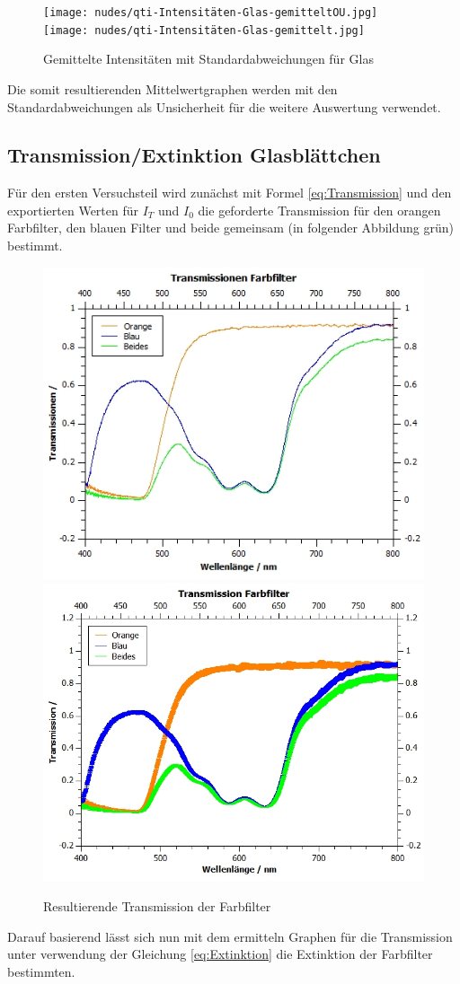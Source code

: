 \documentclass[12pt,a4paper,twoside]{article}
\begin{document}
\begin{figure}[H]
    \centering
    \texttt{[image: nudes/qti-Intensitäten-Glas-gemitteltOU.jpg]}
    \texttt{[image: nudes/qti-Intensitäten-Glas-gemittelt.jpg]}
    \caption{Gemittelte Intensitäten mit Standardabweichungen für Glas}
    \label{fig:GemittelteGraphenIntensitätenGlas}
\end{figure}

\noindent
Die somit resultierenden Mittelwertgraphen werden mit den Standardabweichungen als Unsicherheit für die weitere Auswertung verwendet.

\subsection{Transmission/Extinktion Glasblättchen}

Für den ersten Versuchsteil wird zunächst mit Formel \ref{eq:Transmission} und den exportierten Werten für $I_{T}$ und $I_{0}$ die geforderte Transmission für den orangen Farbfilter, den blauen Filter und beide gemeinsam (in folgender Abbildung grün) bestimmt.

\begin{figure}[H]
    \centering
    \includegraphics[width=0.4\linewidth]{nudes/qti-Transmission-FarbfilterOU.jpg}
    \includegraphics[width=0.4\linewidth]{nudes/qti-Transmission-Farbfilter.jpg}
    \caption{Resultierende Transmission der Farbfilter}
    \label{fig:TransmissionFarbfilter}
\end{figure}

\noindent
Darauf basierend lässt sich nun mit dem ermitteln Graphen für die Transmission unter verwendung der Gleichung \ref{eq:Extinktion} die Extinktion der Farbfilter bestimmten.
\end{document}
